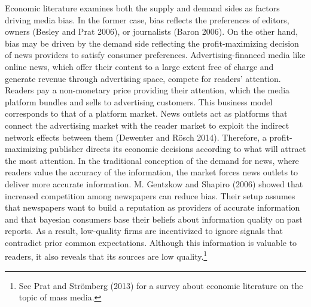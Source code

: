 \documentclass[
  12pt,
]{article}
\begin{document}
Economic literature examines both the supply and demand sides as factors
driving media bias. In the former case, bias reflects the preferences of
editors, owners (Besley and Prat 2006), or journalists (Baron 2006). On
the other hand, bias may be driven by the demand side reflecting the
profit-maximizing decision of news providers to satisfy consumer
preferences. Advertising-financed media like online news, which offer
their content to a large extent free of charge and generate revenue
through advertising space, compete for readers' attention. Readers pay a
non-monetary price providing their attention, which the media platform
bundles and sells to advertising customers. This business model
corresponds to that of a platform market. News outlets act as platforms
that connect the advertising market with the reader market to exploit
the indirect network effects between them (Dewenter and Rösch 2014).
Therefore, a profit-maximizing publisher directs its economic decisions
according to what will attract the most attention. In the traditional
conception of the demand for news, where readers value the accuracy of
the information, the market forces news outlets to deliver more accurate
information. M. Gentzkow and Shapiro (2006) showed that increased
competition among newspapers can reduce bias. Their setup assumes that
newspapers want to build a reputation as providers of accurate
information and that bayesian consumers base their beliefs about
information quality on past reports. As a result, low-quality firms are
incentivized to ignore signals that contradict prior common
expectations. Although this information is valuable to readers, it also
reveals that its sources are low quality.\footnote{See Prat and
  Strömberg (2013) for a survey about economic literature on the topic
  of mass media.}
\end{document}
